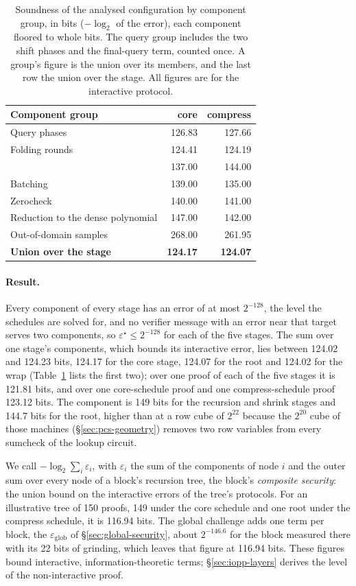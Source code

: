 \begin{table}[t]
\centering
\small
\caption{Soundness of the analysed configuration by component group, in bits ($-\log_2$ of the error), each component floored to whole bits. The query group includes the two shift phases and the final-query term, counted once. A group's figure is the union over its members, and the last row the union over the stage. All figures are for the interactive protocol.}
\label{tab:components}
\begin{tabular}{lrr}
\toprule
Component group & core & compress \\
\midrule
Query phases & 126.83 & 127.66 \\
Folding rounds & 124.41 & 124.19 \\
\LogUp{} & 137.00 & 144.00 \\
Batching & 139.00 & 135.00 \\
Zerocheck & 140.00 & 141.00 \\
Reduction to the dense polynomial & 147.00 & 142.00 \\
Out-of-domain samples & 268.00 & 261.95 \\
\midrule
\textbf{Union over the stage} & \textbf{124.17} & \textbf{124.07} \\
\bottomrule
\end{tabular}
\end{table}

\paragraph{Result.} Every component of every stage has an error of at most $2^{-128}$, the level the schedules are solved for, and no verifier message with an error near that target serves two components, so $\varepsilon^\star \le 2^{-128}$ for each of the five stages. The sum over one stage's components, which bounds its interactive error, lies between 124.02 and 124.23 bits, 124.17 for the core stage, 124.07 for the root and 124.02 for the wrap (Table~\ref{tab:components} lists the first two); over one proof of each of the five stages it is 121.81 bits, and over one core-schedule proof and one compress-schedule proof 123.12 bits. The \LogUp{} component is 149 bits for the recursion and shrink stages and 144.7 bits for the root, higher than at a row cube of $2^{22}$ because the $2^{20}$ cube of those machines (\S\ref{sec:pcs-geometry}) removes two row variables from every sumcheck of the lookup circuit.

We call $-\log_2 \sum_i \varepsilon_i$, with $\varepsilon_i$ the sum of the components of node $i$ and the outer sum over every node of a block's recursion tree, the block's \emph{composite security}: the union bound on the interactive errors of the tree's protocols. For an illustrative tree of 150 proofs, 149 under the core schedule and one root under the compress schedule, it is 116.94 bits. The global challenge adds one term per block, the $\varepsilon_{\mathrm{glob}}$ of \S\ref{sec:global-security}, about $2^{-146.6}$ for the block measured there with its 22 bits of grinding, which leaves that figure at 116.94 bits. These figures bound interactive, information-theoretic terms; \S\ref{sec:iopp-layers} derives the level of the non-interactive proof.

